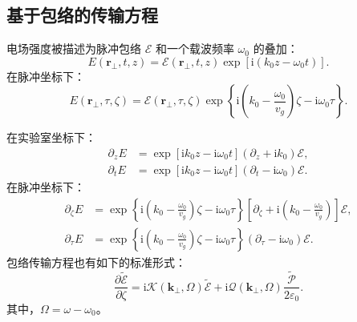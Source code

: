 \documentclass[a4paper,12pt]{ctexart}
\numberwithin{equation}{section}
\newcommand{\vect}[1]{\bm{#1}}
\begin{document}
\subsection{基于包络的传输方程}
电场强度被描述为脉冲包络 $\mathcal{E}$ 和一个载波频率 $\omega_0$ 的叠加：
\begin{equation}
  E(\vect{r}_\perp,t,z)=\mathcal{E}(\vect{r}_\perp,t,z)
  \exp[\mathrm{i}(k_0z-\omega_0t)].
\end{equation}
在脉冲坐标下：
\begin{equation}
  E(\vect{r}_\perp,\tau,\zeta)=\mathcal{E}(\vect{r}_\perp,\tau,\zeta)
  \exp\left\{\mathrm{i}\left(k_0-\frac{\omega_0}{v_g}\right)\zeta
  -\mathrm{i}\omega_0\tau\right\}.
\end{equation}

在实验室坐标下：
\begin{equation}
  \begin{aligned}
    \partial_zE
     & =\exp[\mathrm{i}k_0z-\mathrm{i}\omega_0t](\partial_z+\mathrm{i}k_0)\mathcal{E},      \\
    \partial_tE
     & =\exp[\mathrm{i}k_0z-\mathrm{i}\omega_0t](\partial_t-\mathrm{i}\omega_0)\mathcal{E}.
  \end{aligned}
  \label{eq:lab-frame}
\end{equation}
在脉冲坐标下：
\begin{equation}
  \begin{aligned}
    \partial_\zeta E
     & =\exp\left\{\mathrm{i}\left(k_0-\frac{\omega_0}{v_g}\right)\zeta
    -\mathrm{i}\omega_0\tau\right\}
    \left[\partial_\zeta+\mathrm{i}\left(k_0-\frac{\omega_0}{v_g}\right)\right]\mathcal{E}, \\
    \partial_\tau E
     & =\exp\left\{\mathrm{i}\left(k_0-\frac{\omega_0}{v_g}\right)\zeta
    -\mathrm{i}\omega_0\tau\right\}
    (\partial_\tau-\mathrm{i}\omega_0)\mathcal{E}.
  \end{aligned}
  \label{eq:pulse-frame}
\end{equation}
包络传输方程也有如下的标准形式：
\begin{equation}
  \frac{\partial\widetilde{\mathcal{E}}}{\partial\zeta}
  =\mathrm{i}\mathcal{K}(\vect{k}_\perp,\Omega)\widetilde{\mathcal{E}}
  +\mathrm{i}\mathcal{Q}(\vect{k}_\perp,\Omega)
  \frac{\widetilde{\mathcal{P}}}{2\varepsilon_0}.
  \label{eq:envelope-canonical}
\end{equation}
其中，$\Omega=\omega-\omega_0$。
\end{document}
